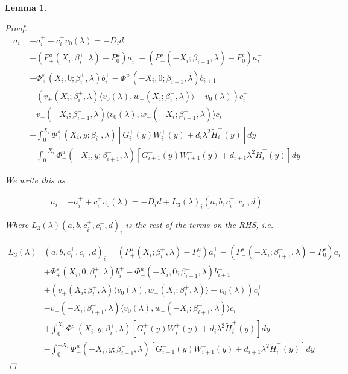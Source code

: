 \documentclass[12pt]{article}
\newtheorem{lemma}{Lemma}
\begin{document}
\begin{lemma}
\begin{proof}
\begin{align*}
a_i^- &- a_i^+ + c_i^+ v_0(\lambda) = -D_i d  \\
&+ (P^u_+(X_i; \beta_i^+, \lambda) - P_0^u)a_i^+ - (P^s_-(-X_i; \beta_{i+1}^-,\lambda) - P_0^s)a_i^- \\
&+ \Phi^s_+(X_i, 0; \beta_i^+, \lambda)b_i^+ - \Phi^u_-(-X_i, 0; \beta_{i+1}^-, \lambda) b_{i+1}^- \\
&+ (v_+(X_i; \beta_i^+, \lambda) \langle v_0(\lambda), w_+(X_i; \beta_i^+, \lambda) \rangle - v_0(\lambda) ) c_i^+ \\
&- v_-(-X_i; \beta_{i+1}^-, \lambda) \langle v_0(\lambda), w_-(-X_i; \beta_{i+1}^-, \lambda) \rangle c_i^- \\
&+ \int_0^{X_i} \Phi^s_+(X_i, y; \beta_i^+, \lambda) [ G_i^+(y) W_i^+(y) + d_i \lambda^2 \tilde{H}_i^+(y) ] dy \\
&- \int_0^{-X_i} \Phi^u_-(-X_i, y; \beta_{i+1}^-, \lambda) [ G_{i+1}^-(y) W_{i+1}^-(y) + d_{i+1} \lambda^2 \tilde{H}_i^-(y) ] dy
\end{align*}

We write this as

\begin{align*}
a_i^- &- a_i^+ + c_i^+ v_0(\lambda) = -D_i d + L_3(\lambda)_i(a, b, c_i^+, c_i^-, d)
\end{align*}

Where $L_3(\lambda)(a, b, c_i^+, c_i^-, d)_i$ is the rest of the terms on the RHS, i.e. 

\begin{align*}
L_3(\lambda)&(a, b, c_i^+, c_i^-, d)_i = (P^u_+(X_i; \beta_i^+, \lambda) - P_0^u)a_i^+ - (P^s_-(-X_i; \beta_{i+1}^-,\lambda) - P_0^s)a_i^- \\
&+ \Phi^s_+(X_i, 0; \beta_i^+, \lambda)b_i^+ - \Phi^u_-(-X_i, 0; \beta_{i+1}^-, \lambda) b_{i+1}^- \\
&+ (v_+(X_i; \beta_i^+, \lambda) \langle v_0(\lambda), w_+(X_i; \beta_i^+, \lambda) \rangle - v_0(\lambda)) c_i^+ \\
&- v_-(-X_i; \beta_{i+1}^-, \lambda) \langle v_0(\lambda), w_-(-X_i; \beta_{i+1}^-, \lambda) \rangle c_i^- \\
&+ \int_0^{X_i} \Phi^s_+(X_i, y; \beta_i^+, \lambda) [ G_i^+(y) W_i^+(y) + d_i \lambda^2 \tilde{H}_i^+(y) ] dy \\
&- \int_0^{-X_i} \Phi^u_-(-X_i, y; \beta_{i+1}^-, \lambda) [ G_{i+1}^-(y) W_{i+1}^-(y) + d_{i+1} \lambda^2 \tilde{H}_i^-(y) ] dy
\end{align*}


\end{proof}
\end{lemma}
\end{document}
